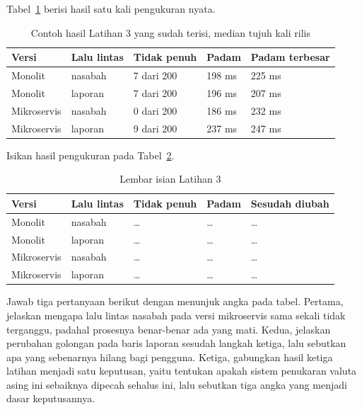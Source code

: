 Tabel~\ref{tab:lat3mikro-contoh} berisi hasil satu kali pengukuran nyata.

\begin{table}[htbp]
  \centering
  \caption{Contoh hasil Latihan 3 yang sudah terisi, median tujuh kali rilis}
  \label{tab:lat3mikro-contoh}
  \begin{tabularx}{\textwidth}{|l|X|l|l|l|}
    \hline
    \textbf{Versi} & \textbf{Lalu lintas} & \textbf{Tidak penuh} & \textbf{Padam} & \textbf{Padam terbesar} \\
    \hline
    Monolit & nasabah & 7 dari 200 & 198 ms & 225 ms \\
    \hline
    Monolit & laporan & 7 dari 200 & 196 ms & 207 ms \\
    \hline
    Mikroservis & nasabah & 0 dari 200 & 186 ms & 232 ms \\
    \hline
    Mikroservis & laporan & 9 dari 200 & 237 ms & 247 ms \\
    \hline
  \end{tabularx}
\end{table}

Isikan hasil pengukuran pada Tabel~\ref{tab:lat3mikro-hasil}.

\begin{table}[htbp]
  \centering
  \caption{Lembar isian Latihan 3}
  \label{tab:lat3mikro-hasil}
  \begin{tabularx}{\textwidth}{|l|X|l|l|l|}
    \hline
    \textbf{Versi} & \textbf{Lalu lintas} & \textbf{Tidak penuh} & \textbf{Padam} & \textbf{Sesudah diubah} \\
    \hline
    Monolit & nasabah & \dots & \dots & \dots \\
    \hline
    Monolit & laporan & \dots & \dots & \dots \\
    \hline
    Mikroservis & nasabah & \dots & \dots & \dots \\
    \hline
    Mikroservis & laporan & \dots & \dots & \dots \\
    \hline
  \end{tabularx}
\end{table}

Jawab tiga pertanyaan berikut dengan menunjuk angka pada tabel. Pertama,
jelaskan mengapa lalu lintas nasabah pada versi mikroservis sama sekali tidak
terganggu, padahal prosesnya benar-benar ada yang mati. Kedua, jelaskan
perubahan golongan pada baris laporan sesudah langkah ketiga, lalu sebutkan apa
yang sebenarnya hilang bagi pengguna. Ketiga, gabungkan hasil ketiga latihan
menjadi satu keputusan, yaitu tentukan apakah sistem penukaran valuta asing ini
sebaiknya dipecah sehalus ini, lalu sebutkan tiga angka yang menjadi dasar
keputusannya.

